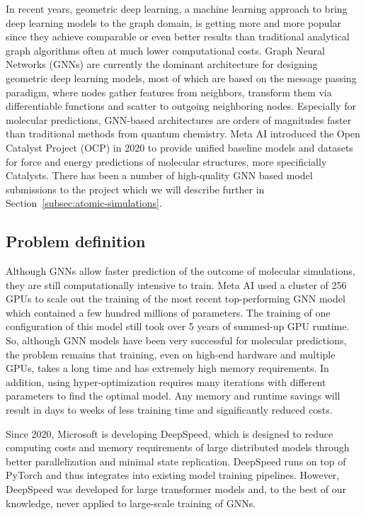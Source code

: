 In recent years, geometric deep learning, a machine learning approach to bring deep learning models 
to the graph domain, is getting more and more popular since they achieve comparable or even better 
results than traditional analytical graph algorithms often at much lower computational costs. Graph Neural 
Networks (GNNs) are currently the dominant architecture for designing geometric deep learning models, most of
which are based on the message passing paradigm, where nodes gather features from neighbors, transform them via 
differentiable functions and scatter to outgoing neighboring nodes. Especially for molecular predictions, 
GNN-based architectures are orders of magnitudes faster than traditional methods from quantum chemistry. 
Meta AI introduced the Open Catalyst Project (OCP) \cite*{Chanussot_2021} in 2020 to provide unified baseline models and datasets for 
force and energy predictions of molecular structures, more specificially Catalysts. There has been a number 
of high-quality GNN based model submissions 
\cite*{DBLP:journals/corr/abs-2003-03123, https://doi.org/10.48550/arxiv.2106.08903, https://doi.org/10.48550/arxiv.2203.09697} to the project which we will describe further in 
Section~\ref{subsec:atomic-simulations}.

\subsection{Problem definition}

Although GNNs allow faster prediction of the outcome of molecular simulations, they are still computationally intensive 
to train. Meta AI used a cluster of 256 GPUs to scale out the training of the most recent top-performing GNN model 
which contained a few hundred millions of parameters. The training of one configuration of this model still took over 5 
years of summed-up GPU runtime. So, although GNN models have been very successful for molecular predictions, 
the problem remains that training, even on high-end hardware and multiple GPUs, takes a long time and has extremely 
high memory requirements. In addition, using hyper-optimization requires many iterations with different parameters to 
find the optimal model. Any memory and runtime savings will result in days to weeks of less training time and significantly 
reduced costs.

Since 2020, Microsoft is developing DeepSpeed, which is designed to reduce computing costs and memory 
requirements of large distributed models through better parallelization and minimal state replication. DeepSpeed 
runs on top of PyTorch and thus integrates into existing model training pipelines. However, DeepSpeed was developed 
for large transformer models and, to the best of our knowledge, never applied to large-scale training of GNNs.

